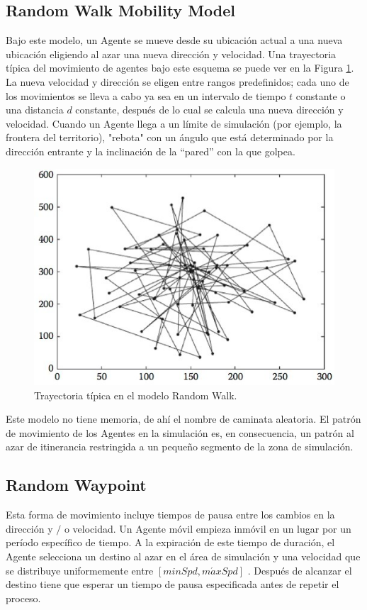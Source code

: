 \subsection{Random Walk Mobility Model}
Bajo este modelo, un Agente se mueve desde su ubicación actual a una nueva ubicación eligiendo al azar una nueva dirección y velocidad.  Una trayectoria típica del movimiento de agentes bajo este esquema se puede ver en la Figura \ref{fig:1-1}.  La nueva velocidad y dirección se eligen entre rangos predefinidos; cada uno de los movimientos se lleva a cabo ya sea en un intervalo de tiempo  $t$ constante o una distancia $d$  constante, después de lo cual se calcula una nueva dirección y velocidad. Cuando un Agente llega a un límite de simulación (por ejemplo, la frontera del territorio), "rebota" con un ángulo que está determinado por la dirección entrante y la inclinación de la “pared” con la que golpea.\\

\begin{figure}[H]
\centering
\captionsetup{justification=centering,margin=2cm}
\includegraphics{chapters/chapter8/figures/1-1}
\caption{Trayectoria típica en el modelo Random Walk.}
\label{fig:1-1}
\end{figure}
Este modelo no tiene memoria, de ahí el nombre de caminata aleatoria. El patrón de movimiento de los Agentes en la simulación es, en consecuencia, un patrón al azar de itinerancia restringida a un pequeño segmento de la zona de simulación. 

\subsection{Random Waypoint}
Esta forma de movimiento incluye tiempos de pausa entre los cambios en la dirección y $/$ o velocidad. Un Agente móvil empieza inmóvil en un lugar por un período específico de tiempo.  A la expiración de este tiempo de duración, el Agente selecciona un destino al azar en el área de simulación y una velocidad que se distribuye uniformemente entre $[minSpd,m\acute{a}xSpd]$ . Después de alcanzar el destino tiene que esperar un tiempo de pausa especificada antes de repetir el proceso.

